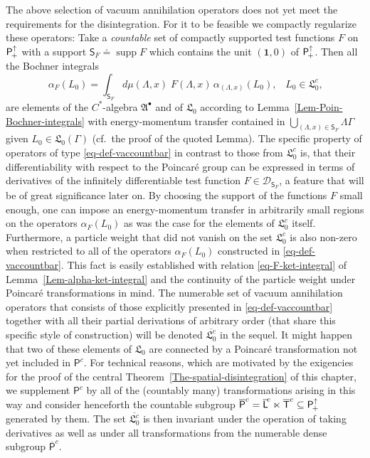 \documentclass[11pt,twoside,openright]{report}
\theoremstyle{definition}
\theoremstyle{plain}
\theoremstyle{remark}
\theoremstyle{assumption}
\DeclareMathOperator{\supp}{supp}
\newcommand{\Lfrak}{\mathfrak{L}}
\newcommand{\Dscr}{\mathscr{D}}
\newcommand{\Ssf}{\mathsf{S}}
\newcommand{\unit}{\mathbf{1}}
\newcommand{\Poin}{\mathsf{P}_{\negthinspace +}^\uparrow}
\newcommand{\aLax}{\alpha_{( \Lambda , x )}}
\newcommand{\Lbarcount}{\overline{\mathsf{L}}^{\negthinspace c}}
\newcommand{\Pcount}{\mathsf{P}^c}
\newcommand{\Pbarcount}{\overline{\mathsf{P}}^c}
\newcommand{\Tbarcount}{\overline{\mathsf{T}}^c}
\newcommand{\vaccount}{\mathfrak{L}_0^c}
\newcommand{\vaccountbar}{\overline{\mathfrak{L}_0^c}}
\newcommand{\Abullet}{\mathfrak{A}^\bullet}
\begin{document}
The above selection of vacuum annihilation operators does not yet meet
the requirements for the disintegration. For it to be feasible we
compactly regularize these operators: Take a \emph{countable} set of
compactly supported test functions $F$ on $\Poin$ with a support
$\Ssf_F \doteq \supp F$ which contains the unit $( \unit , 0 )$ of
$\Poin$. Then all the Bochner integrals
\begin{equation}
  \label{eq-def-vaccountbar}
  \alpha_F ( L_0 ) = \int_{\Ssf_F} d \mu ( \Lambda , x ) \; F (
  \Lambda , x ) \, \aLax ( L_0 ) \text{,} \quad L_0 \in \vaccount
  \text{,}
\end{equation}
are elements of the $C^*$-algebra $\Abullet$ and of $\Lfrak_0$
according to Lemma~\ref{Lem-Poin-Bochner-integrals} with
energy-momentum transfer contained in $\bigcup_{( \Lambda , x ) \in
\Ssf_F} \Lambda \Gamma$ given $L_0 \in \Lfrak_0 ( \Gamma )$ (cf.~the
proof of the quoted Lemma). The specific property of operators of type
\eqref{eq-def-vaccountbar} in contrast to those from $\vaccount$ is,
that their differentiability with respect to the Poincar\'{e} group
can be expressed in terms of derivatives of the infinitely
differentiable test function $F \in \Dscr_{\Ssf_F}$, a feature that
will be of great significance later on. By choosing the support of the
functions $F$ small enough, one can impose an energy-momentum transfer
in arbitrarily small regions on the operators $\alpha_F ( L_0 )$ as
was the case for the elements of $\vaccount$ itself. Furthermore, a
particle weight that did not vanish on the set $\vaccount$ is also
non-zero when restricted to all of the operators $\alpha_F ( L_0 )$
constructed in \eqref{eq-def-vaccountbar}. This fact is easily
established with relation \eqref{eq-F-ket-integral} of
Lemma~\ref{Lem-alpha-ket-integral} and the continuity of the particle
weight under Poincar\'{e} transformations in mind. The numerable set
of vacuum annihilation operators that consists of those explicitly
presented in \eqref{eq-def-vaccountbar} together with all their
partial derivations of arbitrary order (that share this specific style
of construction) will be denoted $\vaccountbar$ in the sequel. It
might happen that two of these elements of $\Lfrak_0$ are connected by
a Poincar\'{e} transformation not yet included in $\Pcount$. For
technical reasons, which are motivated by the exigencies for the proof
of the central Theorem~\ref{The-spatial-disintegration} of this
chapter, we supplement $\Pcount$ by all of the (countably many)
transformations arising in this way and consider henceforth the
countable subgroup $\Pbarcount = \Lbarcount \ltimes \Tbarcount
\subseteq \Poin$ generated by them. The set $\vaccountbar$ is then
invariant under the operation of taking derivatives as well as under
all transformations from the numerable dense subgroup $\Pbarcount$.
\end{document}
